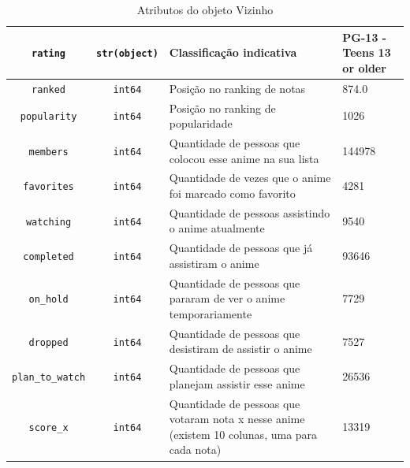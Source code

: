 \begin{table}[h]
\begin{tabular}{|c|c|l|l|}
        \texttt{rating}  & \texttt{str(object)}    & Classificação indicativa & PG-13 - Teens 13 or older \\ \hline
        \texttt{ranked}  & \texttt{int64}    & Posição no ranking de notas & 874.0 \\ \hline
        \texttt{popularity}  & \texttt{int64}    & Posição no ranking de popularidade & 1026 \\ \hline
        \texttt{members}  & \texttt{int64}    & Quantidade de pessoas que colocou esse anime na sua lista & 144978 \\ \hline
        \texttt{favorites}  & \texttt{int64}    & Quantidade de vezes que o anime foi marcado como favorito & 4281 \\ \hline
        \texttt{watching}  & \texttt{int64}    & Quantidade de pessoas assistindo o anime atualmente & 9540 \\ \hline
        \texttt{completed}  & \texttt{int64}    & Quantidade de pessoas que já assistiram o anime & 93646 \\ \hline
        \texttt{on_hold}  & \texttt{int64}    & Quantidade de pessoas que pararam de ver o anime temporariamente & 7729 \\ \hline
        \texttt{dropped}  & \texttt{int64}    & Quantidade de pessoas que desistiram de assistir o anime & 7527 \\ \hline
        \texttt{plan_to_watch}  & \texttt{int64}    & Quantidade de pessoas que planejam assistir esse anime & 26536 \\ \hline
        \texttt{score_x}  & \texttt{int64}    & Quantidade de pessoas que votaram nota x nesse anime (existem 10 colunas, uma para cada nota) & 13319 \\ \hline
    \end{tabular}
    \caption{Atributos do objeto Vizinho}
    \label{tab:vizinho}
\end{table}